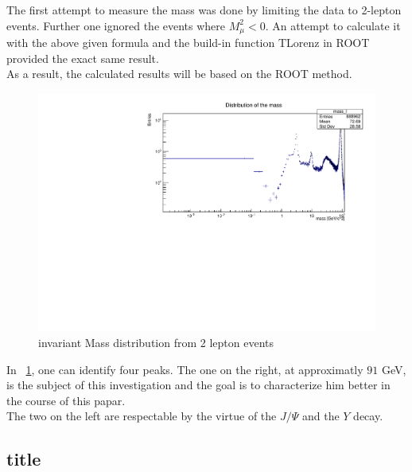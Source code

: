 \documentclass[12pt, a4paper, bibliography=totoc]{scrreprt}
\begin{document}
The first attempt to measure the mass was done by limiting the data to 2-lepton events. Further one ignored the events where $M_{\mu}^{2} < 0$. An attempt to calculate it with the above given formula and the build-in function TLorenz in ROOT provided the exact same result.\\
As a result, the calculated results will be based on the ROOT method.

\begin{figure}
	\centering
	\includegraphics[scale=0.5]{fig/mass_lz_log.pdf}
	\caption{invariant Mass distribution from 2 lepton events}
	\label{mass_lz_log}
\end{figure}

In ~\ref{mass_lz_log}, one can identify four peaks. The one on the right, at approximatly $91$ GeV, is the subject of this investigation and the goal is to characterize him better in the course of this papar.\\
The two on the left are respectable by the virtue of the $J/{\Psi}$ and the $Y$ decay. 
\subsection{title} 
\nocite{*}
\appendix
\printbibliography
\end{document}
